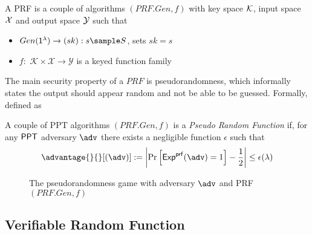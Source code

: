 \begin{definition}
    A PRF is a couple of algorithms $(PRF.Gen, f)$ with key space $\mathcal{K}$, input space $\mathcal{X}$ and output space $\mathcal{Y}$ such that 
    \begin{itemize}
        \item $Gen(\secparam) \to (sk): s \sample S$, sets $sk = s$
        \item $f:$ $\mathcal{K} \times \mathcal{X} \to \mathcal{Y}$ is a keyed function family
    \end{itemize}
\end{definition}

The main security property of a $PRF$ is pseudorandomness, which informally states the output should appear random and not be able to be guessed. Formally, defined as

\begin{definition}[Pseudorandomness]
    A couple of PPT algorithms $(PRF.Gen, f)$ is a \textit{Pseudo Random Function} if, for any $\mathsf{PPT}$ adversary $\adv$ there exists a negligible function $\epsilon$ such that 
    \[
    \advantage{}{}[(\adv)] := 
        \left|
    \Pr     \left[ 
                \mathsf{Exp}^{\mathsf{prf}}(\adv) = 1
            \right] - \frac{1}{2}
        \right| \leq \epsilon(\lambda)
    \]
\end{definition}

\begin{figure}
\begin{pchstack}[boxed, center, space=1em]
\end{pchstack}
  \caption{The pseudorandomness game with adversary $\adv$ and PRF $(PRF.Gen, f)$}
  \label{fig:prf}
\end{figure}


\subsection{Verifiable Random Function}

